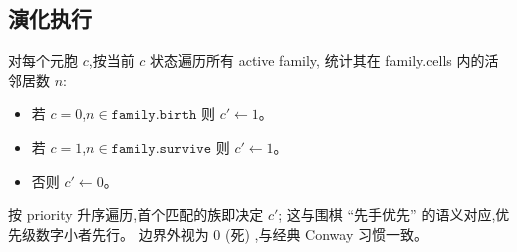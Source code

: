 \documentclass[11pt,a4paper]{article}
\begin{document}
\subsection{演化执行}
对每个元胞 $c$,按当前 $c$ 状态遍历所有 active family,
统计其在 family.cells 内的活邻居数 $n$:
\begin{itemize}[leftmargin=*,itemsep=0pt,topsep=0pt]
\item 若 $c=0$,$n \in \texttt{family.birth}$ 则 $c' \gets 1$。
\item 若 $c=1$,$n \in \texttt{family.survive}$ 则 $c' \gets 1$。
\item 否则 $c' \gets 0$。
\end{itemize}
按 priority 升序遍历,首个匹配的族即决定 $c'$;
这与围棋 ``先手优先'' 的语义对应,优先级数字小者先行。
边界外视为 0 (死) ,与经典 Conway 习惯一致。
\end{document}
